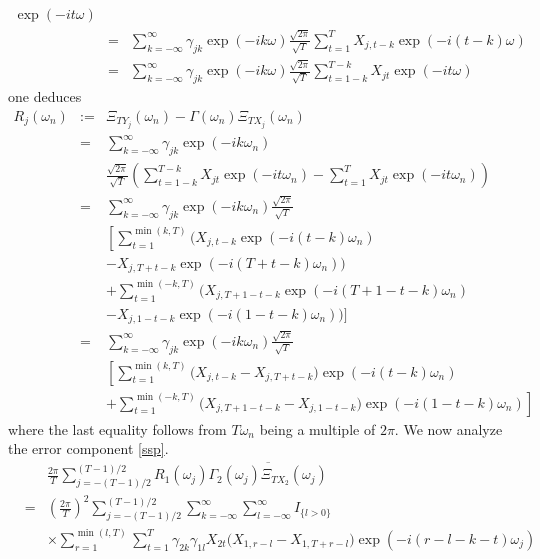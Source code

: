 \documentclass[11pt]{article}
\begin{document}
\begin{appendix}
\begin{eqnarray}
\exp(-it
\omega)\nonumber\\
&=&\sum_{k=-\infty}^{\infty}\gamma_{jk}\exp(-ik\omega)\frac{\sqrt{2\pi}}{\sqrt{T}}
\sum_{t=1}^{T}
X_{j,t-k}\exp(-i(t-k)\omega)\nonumber\\
&=&\sum_{k=-\infty}^{\infty}\gamma_{jk}\exp(-ik\omega)\frac{\sqrt{2\pi}}{\sqrt{T}}
\sum_{t=1-k}^{T-k} X_{jt}\exp(-it\omega)\nonumber
\end{eqnarray}
one deduces
\begin{eqnarray}
R_{j}(\omega_n)&:=&\Xi_{TY_j}(\omega_n)-\Gamma(\omega_n)\Xi_{TX_j}(\omega_n)\nonumber\\
&=&\sum_{k=-\infty}^{\infty}\gamma_{jk}\exp(-ik\omega_n)\nonumber\\
&&\frac{\sqrt{2\pi}}{\sqrt{T}} \left(\sum_{t=1-k}^{T-k}
X_{jt}\exp(-it\omega_n)-\sum_{t=1}^{T}
X_{jt}\exp(-it\omega_n)\right)\nonumber\\
&=&\sum_{k=-\infty}^{\infty}\gamma_{jk}\exp(-ik\omega_n)\frac{\sqrt{2\pi}}{\sqrt{T}}\nonumber\\
&&\left[\sum_{t=1}^{\min(k,T)} \Big(X_{j,t-k}\exp(-i(t-k)\omega_n)\right.\nonumber\\
&&-X_{j,T+t-k}\exp(-i(T+t-k)\omega_n)\Big)\nonumber\\
&&+\sum_{t=1}^{\min(-k,T)}
\Big(X_{j,T+1-t-k}\exp(-i(T+1-t-k)\omega_n)\nonumber\\
&&-X_{j,1-t-k}\exp(-i(1-t-k)\omega_n)\Big)\Bigg]
\nonumber\\
&=&\sum_{k=-\infty}^{\infty}\gamma_{jk}\exp(-ik\omega_n)\frac{\sqrt{2\pi}}{\sqrt{T}}\nonumber\\
&&\left[\sum_{t=1}^{\min(k,T)} \Big(X_{j,t-k}-X_{j,T+t-k}\Big)\exp(-i(t-k)\omega_n)\right.\nonumber\\
&&+\left.\sum_{t=1}^{\min(-k,T)}
\Big(X_{j,T+1-t-k}-X_{j,1-t-k}\Big)\exp(-i(1-t-k)\omega_n)\right]\nonumber
\end{eqnarray}
where the last equality follows from $T\omega_n$ being a multiple of
$2\pi$. We now analyze the error component \ref{ssp}.
\begin{eqnarray*}
&&\frac{2\pi}{T}\sum_{j=-(T-1)/2}^{(T-1)/2}R_1(\omega_j)
\overline{\Gamma_2(\omega_j)\Xi_{TX_2}(\omega_j)}\\
&=&\left(\frac{2\pi}{T}\right)^2\sum_{j=-(T-1)/2}^{(T-1)/2}\sum_{k=-\infty}^\infty
\sum_{l=-\infty}^\infty
I_{\{l>0\}}\\
&&\times\sum_{r=1}^{\min(l,T)} \sum_{t=1}^{T}
\gamma_{2k}\gamma_{1l}X_{2t}
\Big(X_{1,r-l}-X_{1,T+r-l}\Big)\exp(-i(r-l-k-t)\omega_j)\\

\end{eqnarray*}
\end{appendix}
\end{document}
